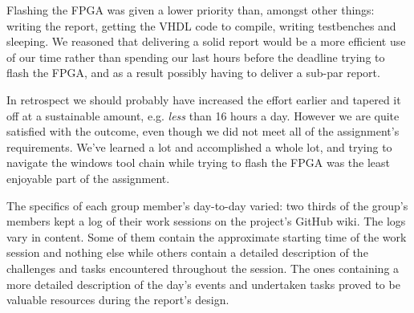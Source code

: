 Flashing the FPGA was given a lower priority than, amongst other things: writing the report, getting the VHDL code to compile, writing testbenches and sleeping.
We reasoned that delivering a solid report would be a more efficient use of our time rather than spending our last hours before the deadline trying to flash the FPGA, and as a result possibly having to deliver a sub-par report.

In retrospect we should probably have increased the effort earlier and tapered it off at a sustainable amount, e.g. \textit{less} than 16 hours a day.
However we are quite satisfied with the outcome, even though we did not meet all of the assignment's requirements.
We've learned a lot and accomplished a whole lot, and trying to navigate the windows tool chain while trying to flash the FPGA was the least enjoyable part of the assignment.

The specifics of each group member's day-to-day varied: two thirds of the group's members kept a log of their work sessions on the project's GitHub wiki. 
The logs vary in content.
Some of them contain the approximate starting time of the work session and nothing else while others contain a detailed description of the challenges and tasks encountered throughout the session.
The ones containing a more detailed description of the day's events and undertaken tasks proved to be valuable resources during the report's design.

